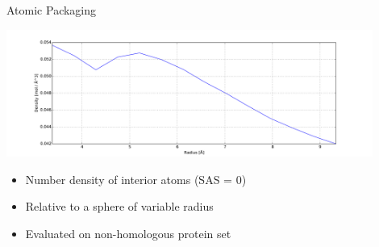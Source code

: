 %
\begin{frame}{Atomic Packaging}
    \begin{center}
        \includegraphics[width=0.9\textwidth]{../results/Density/better.pdf}
    \end{center}

    \begin{itemize}
        \item Number density of interior atoms (SAS = 0)
        \item Relative to a sphere of variable radius
        \item Evaluated on non-homologous protein set
    \end{itemize}
\end{frame}

